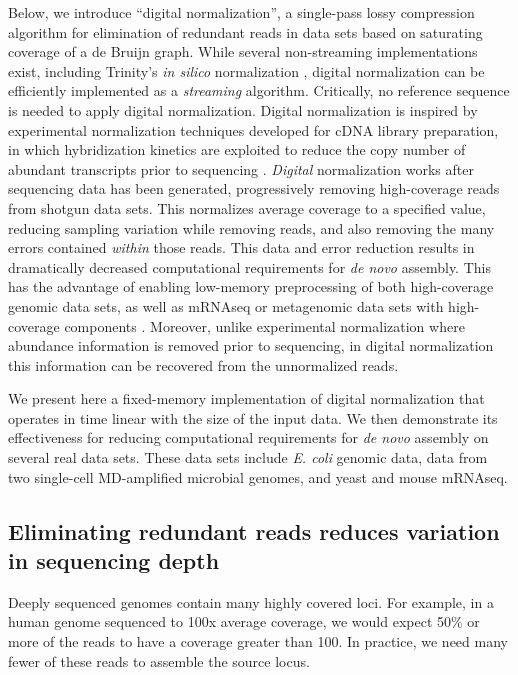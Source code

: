Below, we introduce ``digital normalization'', a single-pass lossy compression
algorithm for elimination of redundant reads in data sets based on saturating
coverage of a de Bruijn graph.   While several non-streaming implementations
exist, including Trinity's {\em in silico} normalization
\cite{Haas2013,Brown2012blog}, digital normalization can be efficiently
implemented as a {\em streaming} algorithm.  Critically, no reference sequence
is needed to apply digital normalization.  Digital normalization is inspired by
experimental normalization techniques developed for cDNA library preparation,
in which hybridization kinetics are exploited to reduce the copy number of
abundant transcripts prior to sequencing \cite{pubmed8889548,pubmed7937745}.
{\em Digital} normalization works after sequencing data has been generated,
progressively removing high-coverage reads from shotgun data sets.  This
normalizes average coverage to a specified value, reducing sampling variation
while removing reads, and also removing the many errors contained {\em within}
those reads.  This data and error reduction results in dramatically decreased
computational requirements for {\em de novo} assembly.  This has the advantage
of enabling low-memory preprocessing of both high-coverage genomic data sets,
as well as mRNAseq or metagenomic data sets with high-coverage components
\cite{Brown2012, Howe2012}. Moreover, unlike experimental normalization where
abundance information is removed prior to sequencing, in digital normalization
this information can be recovered from the unnormalized reads.

We present here a fixed-memory implementation of digital normalization that
operates in time linear with the size of the input data.  We then demonstrate
its effectiveness for reducing computational requirements for {\em de novo} assembly
on several real data sets.  These data sets include {\em E. coli} genomic data,
data from two single-cell MD-amplified microbial genomes, and yeast and mouse
mRNAseq.

\subsection{Eliminating redundant reads reduces variation in sequencing depth}

Deeply sequenced genomes contain many highly covered loci.  For example, in a
human genome sequenced to 100x average coverage, we would expect 50\% or more
of the reads to have a coverage greater than 100. In practice, we need many
fewer of these reads to assemble the source locus.

